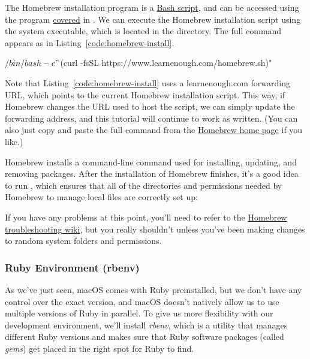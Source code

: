 The Homebrew installation program is a \href{https://www.learnenough.com/text-editor-tutorial/advanced_text_editing#sec-writing_an_executable_script}{Bash script}, and can be accessed using the  program \href{https://www.learnenough.com/command-line-tutorial#sec-downloading_a_file}{covered} in \lecl. We can execute the Homebrew installation script using the system  executable, which is located in the  directory. The full command appears as in Listing~\ref{code:homebrew-install}.

\begin{codelisting}
\label{code:homebrew-install}
\begin{code}
$ /bin/bash -c "$(curl -fsSL https://www.learnenough.com/homebrew.sh)"
\end{code}
\end{codelisting}

\noindent Note that Listing~\ref{code:homebrew-install} uses a learnenough.com forwarding URL, which points to the current Homebrew installation script. This way, if Homebrew changes the URL used to host the script, we can simply update the forwarding address, and this tutorial will continue to work as written. (You can also just copy and paste the full command from the \href{http://brew.sh/}{Homebrew home page} if you like.)

Homebrew installs a  command-line command used for installing, updating, and removing packages. After the installation of Homebrew finishes, it's a good idea to run , which ensures that all of the directories and permissions needed by Homebrew to manage local files are correctly set up:


\noindent If you have any problems at this point, you'll need to refer to the \href{https://github.com/Homebrew/homebrew/wiki/troubleshooting}{Homebrew troubleshooting wiki}, but you really shouldn't unless you've been making changes to random system folders and permissions.


\subsubsection{Ruby Environment (rbenv)}
\label{sec:rbenv}

As we've just seen, macOS comes with Ruby preinstalled, but we don't have any control over the exact version, and macOS doesn't natively allow us to use multiple versions of Ruby in parallel. To give us more flexibility with our development environment, we'll install \emph{rbenv}, which is a utility that manages different Ruby versions and makes sure that Ruby software packages (called \emph{gems}) get placed in the right spot for Ruby to find.


